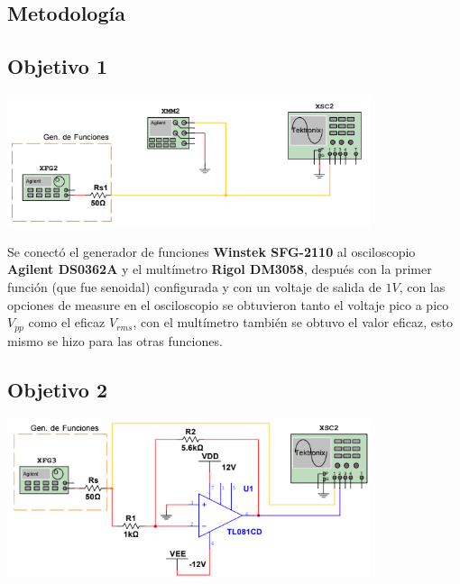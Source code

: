 \documentclass[DIV=calc, paper=a4, fontsize=11pt]{scrartcl}
\newenvironment{Figura}
  {\par\medskip\noindent\minipage{\linewidth}}
  {\endminipage\par\medskip}
\begin{document}
\begin{multicols}{2}
\section*{Metodología}
\subsection*{Objetivo 1}

\begin{Figura}
    \centering
    \includegraphics[width=0.8\textwidth]{diagramas/diagrama objetivo 1.PNG}
    \label{fig}
\end{Figura}

Se conectó el generador de funciones \textbf{Winstek SFG-2110} al osciloscopio \textbf{Agilent DS0362A} y el multímetro \textbf{Rigol DM3058}, después con la primer función (que fue senoidal) configurada y con un voltaje de salida de $1V$, con las opciones de measure en el osciloscopio se obtuvieron tanto el voltaje pico a pico $V_{pp}$ como el eficaz $V_{rms}$, con el multímetro también se obtuvo el valor eficaz, esto mismo se hizo para las otras funciones.

\subsection*{Objetivo 2}

\begin{Figura}
    \centering
    \includegraphics[width=0.8\textwidth]{diagramas/diagrama objetivo 2.PNG}
    \label{fig}
\end{Figura}


\end{multicols}
\end{document}
